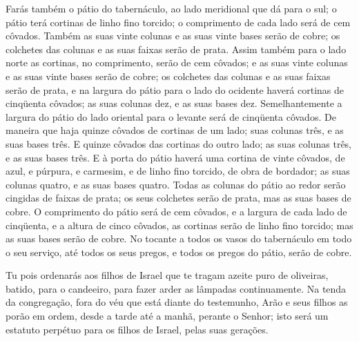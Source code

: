 Farás também o pátio do tabernáculo, ao lado meridional que dá
para o sul; o pátio terá cortinas de linho fino torcido; o
comprimento de cada lado será de cem côvados. Também as suas
vinte colunas e as suas vinte bases serão de cobre; os colchetes das
colunas e as suas faixas serão de prata. Assim também para o
lado norte as cortinas, no comprimento, serão de cem côvados; e as
suas vinte colunas e as suas vinte bases serão de cobre; os
colchetes das colunas e as suas faixas serão de prata, e na
largura do pátio para o lado do ocidente haverá cortinas de
cinqüenta côvados; as suas colunas dez, e as suas bases dez.
Semelhantemente a largura do pátio do lado oriental para o
levante será de cinqüenta côvados. De maneira que haja quinze
côvados de cortinas de um lado; suas colunas três, e as suas bases
três. E quinze côvados das cortinas do outro lado; as suas
colunas três, e as suas bases três. E à porta do pátio haverá
uma cortina de vinte côvados, de azul, e púrpura, e carmesim, e de
linho fino torcido, de obra de bordador; as suas colunas quatro, e
as suas bases quatro. Todas as colunas do pátio ao redor
serão cingidas de faixas de prata; os seus colchetes serão de prata,
mas as suas bases de cobre. O comprimento do pátio será de
cem côvados, e a largura de cada lado de cinqüenta, e a altura de
cinco côvados, as cortinas serão de linho fino torcido; mas as suas
bases serão de cobre. No tocante a todos os vasos do
tabernáculo em todo o seu serviço, até todos os seus pregos, e todos
os pregos do pátio, serão de cobre.

Tu pois ordenarás aos filhos de Israel que te tragam azeite puro
de oliveiras, batido, para o candeeiro, para fazer arder as lâmpadas
continuamente. Na tenda da congregação, fora do véu que está
diante do testemunho, Arão e seus filhos as porão em ordem, desde a
tarde até a manhã, perante o Senhor; isto será um estatuto perpétuo
para os filhos de Israel, pelas suas gerações.

\medskip

